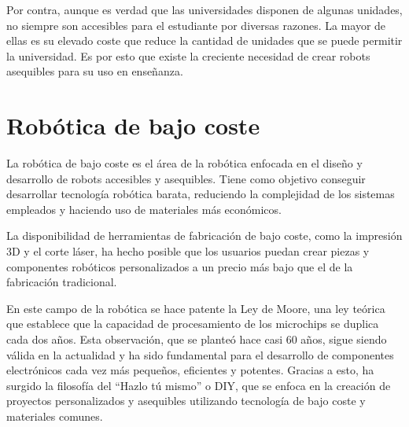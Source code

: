 Por contra, aunque es verdad que las universidades disponen de algunas unidades, no siempre son accesibles para el 
estudiante por diversas razones. La mayor de ellas es su elevado coste que reduce la cantidad de unidades que se puede 
permitir la universidad. Es por esto que existe la creciente necesidad de crear robots asequibles para su uso en enseñanza.

\newpage
\section{Robótica de bajo coste}
\label{sec:rob_bajo:coste}
\noindent La robótica de bajo coste es el área de la robótica enfocada en el diseño y desarrollo de robots 
accesibles y asequibles. Tiene como objetivo conseguir desarrollar tecnología robótica
barata, reduciendo la complejidad de los sistemas empleados y haciendo uso de materiales más económicos.

La disponibilidad de herramientas de fabricación de bajo coste, como la impresión 3D y el corte láser, 
ha hecho posible que los usuarios puedan crear piezas y componentes robóticos personalizados a un 
precio más bajo que el de la fabricación tradicional.

En este campo de la robótica se hace patente la Ley de Moore, una ley teórica 
que establece que la capacidad de procesamiento de los microchips se duplica cada dos años. Esta observación, que 
se planteó hace casi 60 años, sigue siendo válida en la actualidad y ha sido fundamental para el desarrollo de componentes 
electrónicos cada vez más pequeños, eficientes y potentes. Gracias a esto, ha surgido la filosofía del \enquote{Hazlo tú mismo} o \ac{DIY}, que se enfoca en la creación de proyectos personalizados y 
asequibles utilizando tecnología de bajo coste y materiales comunes.

